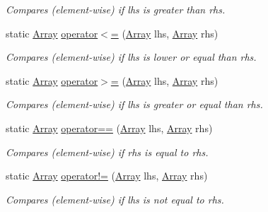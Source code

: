 \begin{DoxyCompactItemize}
\begin{DoxyCompactList}\small\item\em Compares (element-\/wise) if lhs is greater than rhs. \end{DoxyCompactList}\item 
static \mbox{\hyperlink{classkhiva_1_1array_1_1_array}{Array}} \mbox{\hyperlink{classkhiva_1_1array_1_1_array_ac038773f7b9393447aca3232671f6c1a}{operator$<$=}} (\mbox{\hyperlink{classkhiva_1_1array_1_1_array}{Array}} lhs, \mbox{\hyperlink{classkhiva_1_1array_1_1_array}{Array}} rhs)
\begin{DoxyCompactList}\small\item\em Compares (element-\/wise) if lhs is lower or equal than rhs. \end{DoxyCompactList}\item 
static \mbox{\hyperlink{classkhiva_1_1array_1_1_array}{Array}} \mbox{\hyperlink{classkhiva_1_1array_1_1_array_a9c53762fa8e9ef134c18e56fe2e18da8}{operator$>$=}} (\mbox{\hyperlink{classkhiva_1_1array_1_1_array}{Array}} lhs, \mbox{\hyperlink{classkhiva_1_1array_1_1_array}{Array}} rhs)
\begin{DoxyCompactList}\small\item\em Compares (element-\/wise) if lhs is greater or equal than rhs. \end{DoxyCompactList}\item 
static \mbox{\hyperlink{classkhiva_1_1array_1_1_array}{Array}} \mbox{\hyperlink{classkhiva_1_1array_1_1_array_a258905dc9565c1727d9a38ae73d2b110}{operator==}} (\mbox{\hyperlink{classkhiva_1_1array_1_1_array}{Array}} lhs, \mbox{\hyperlink{classkhiva_1_1array_1_1_array}{Array}} rhs)
\begin{DoxyCompactList}\small\item\em Compares (element-\/wise) if rhs is equal to rhs. \end{DoxyCompactList}\item 
static \mbox{\hyperlink{classkhiva_1_1array_1_1_array}{Array}} \mbox{\hyperlink{classkhiva_1_1array_1_1_array_a1533f8e4ae260226062c753da4376f42}{operator!=}} (\mbox{\hyperlink{classkhiva_1_1array_1_1_array}{Array}} lhs, \mbox{\hyperlink{classkhiva_1_1array_1_1_array}{Array}} rhs)
\begin{DoxyCompactList}\small\item\em Compares (element-\/wise) if lhs is not equal to rhs. \end{DoxyCompactList}\end{DoxyCompactItemize}
